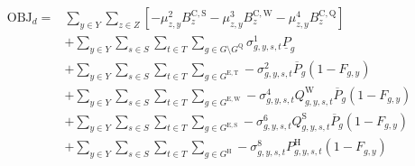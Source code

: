 \documentclass{article}
\newcommand{\sGenerators}{G}
\newcommand{\sGeneratorsExistingThermal}{G^{\mathrm{E,T}}}
\newcommand{\sGeneratorsExistingWind}{G^{\mathrm{E,W}}}
\newcommand{\sGeneratorsExistingSolar}{G^{\mathrm{E,S}}}
\newcommand{\sGeneratorsCandidateThermal}{G^{\mathrm{C,T}}}
\newcommand{\sGeneratorsCandidateWind}{G^{\mathrm{C,W}}}
\newcommand{\sGeneratorsCandidateSolar}{G^{\mathrm{C,S}}}
\newcommand{\sGeneratorsHydro}{G^{\mathrm{H}}}
\newcommand{\sStorage}{G^{\mathrm{Q}}}
\newcommand{\sYears}{Y}
\newcommand{\sScenarios}{S}
\newcommand{\sIntervals}{T}
\newcommand{\sZones}{Z}
\newcommand{\iGenerator}{g}
\newcommand{\iYear}{y}
\newcommand{\iScenario}{s}
\newcommand{\iInterval}{t}
\newcommand{\iZone}{z}
\newcommand{\cPowerOutputMax}[1][\iGenerator,\iYear]{\overline{P}_{#1}}
\newcommand{\cBuildLimitWind}{B^{\mathrm{C,\mathrm{W}}}_{\iZone}}
\newcommand{\cBuildLimitSolar}{B^{\mathrm{C,\mathrm{S}}}_{\iZone}}
\newcommand{\cBuildLimitStorage}{B^{\mathrm{C,\mathrm{Q}}}_{\iZone}}
\newcommand{\cPowerOutputMin}[1][\iGenerator]{\underline{P}_{#1}}
\newcommand{\cCapacityFactorWind}[1][\iGenerator,\iYear,\iScenario,\iInterval]{Q_{#1}^{\mathrm{W}}}
\newcommand{\cCapacityFactorSolar}[1][\iGenerator,\iYear,\iScenario,\iInterval]{Q_{#1}^{\mathrm{S}}}
\newcommand{\cRetirementIndicator}[1][\iGenerator,\iYear]{F_{#1}}
\newcommand{\cPowerOutputHydro}[1][\iGenerator,\iYear,\iScenario,\iInterval]{P^{\mathrm{H}}_{#1}}
\newcommand{\vPower}[1][\iGenerator,\iYear,\iScenario,\iInterval]{p_{#1}}
\newcommand{\vInstalledCapacityTotal}[1][\iGenerator,\iYear]{a_{#1}}
\newcommand{\dSolarBuildLimit}[1][\iZone,\iYear]{\mu_{#1}^{2}}
\newcommand{\dWindBuildLimit}[1][\iZone,\iYear]{\mu_{#1}^{3}}
\newcommand{\dStorageBuildLimit}[1][\iZone,\iYear]{\mu_{#1}^{4}}
\newcommand{\dMinPowerOutput}[1][\iGenerator,\iYear,\iScenario,\iInterval]{\sigma_{#1}^{1}}
\newcommand{\dMaxPowerOutputExistingThermal}[1][\iGenerator,\iYear,\iScenario,\iInterval]{\sigma_{#1}^{2}}
\newcommand{\dMaxPowerOutputCandidateThermal}[1][\iGenerator,\iYear,\iScenario,\iInterval]{\sigma_{#1}^{3}}
\newcommand{\dMaxPowerOutputWindExisting}[1][\iGenerator,\iYear,\iScenario,\iInterval]{\sigma_{#1}^{4}}
\newcommand{\dMaxPowerOutputWindCandidate}[1][\iGenerator,\iYear,\iScenario,\iInterval]{\sigma_{#1}^{5}}
\newcommand{\dMaxPowerOutputSolarExisting}[1][\iGenerator,\iYear,\iScenario,\iInterval]{\sigma_{#1}^{6}}
\newcommand{\dMaxPowerOutputSolarCandidate}[1][\iGenerator,\iYear,\iScenario,\iInterval]{\sigma_{#1}^{7}}
\newcommand{\dMaxPowerOutputHydro}[1][\iGenerator,\iYear,\iScenario,\iInterval]{\sigma_{#1}^{8}}
\begin{document}
\begin{align}
\textrm{OBJ}_{d} =  & \sum\limits_{\iYear \in \sYears} \sum\limits_{\iZone \in \sZones} \left[- \dSolarBuildLimit \cBuildLimitSolar - \dWindBuildLimit \cBuildLimitWind 
- \dStorageBuildLimit \cBuildLimitStorage
\right]\\
& + \sum\limits_{\iYear \in \sYears}\sum\limits_{\iScenario \in \sScenarios}\sum\limits_{\iInterval \in \sIntervals} \sum\limits_{\iGenerator \in \sGenerators \setminus \sStorage} \dMinPowerOutput \cPowerOutputMin\\
& + \sum\limits_{\iYear \in \sYears}\sum\limits_{\iScenario \in \sScenarios}\sum\limits_{\iInterval \in \sIntervals} \sum\limits_{\iGenerator \in \sGeneratorsExistingThermal} - \dMaxPowerOutputExistingThermal \cPowerOutputMax[\iGenerator] \left(1 - \cRetirementIndicator\right)\\
& + \sum\limits_{\iYear \in \sYears}\sum\limits_{\iScenario \in \sScenarios}\sum\limits_{\iInterval \in \sIntervals} \sum\limits_{\iGenerator \in \sGeneratorsExistingWind} - \dMaxPowerOutputWindExisting \cCapacityFactorWind \cPowerOutputMax[\iGenerator] \left(1 - \cRetirementIndicator\right)\\
& + \sum\limits_{\iYear \in \sYears}\sum\limits_{\iScenario \in \sScenarios}\sum\limits_{\iInterval \in \sIntervals} \sum\limits_{\iGenerator \in \sGeneratorsExistingSolar} - \dMaxPowerOutputSolarExisting \cCapacityFactorSolar \cPowerOutputMax[\iGenerator] \left(1 - \cRetirementIndicator\right)\\
& + \sum\limits_{\iYear \in \sYears}\sum\limits_{\iScenario \in \sScenarios}\sum\limits_{\iInterval \in \sIntervals} \sum\limits_{\iGenerator \in \sGeneratorsHydro} - \dMaxPowerOutputHydro \cPowerOutputHydro \left(1 - \cRetirementIndicator\right)\\

\end{align}
\end{document}
